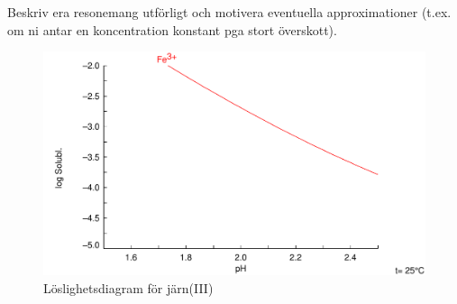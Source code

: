 Beskriv era resonemang utförligt och motivera eventuella approximationer
(t.ex. om ni antar en koncentration konstant pga stort överskott).

\begin{figure}
  \centering
  \includegraphics[scale=0.4]{fig/fe.pdf}
  \caption{Löslighetsdiagram för järn(III)}
  \label{fig:fe}
\end{figure}

